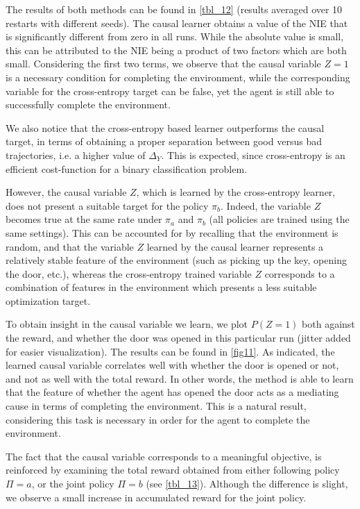 \documentclass[letterpaper]{article} %
\newcommand{\EE}{\mathbb{E}}
\newcommand{\NIE}{\textrm{NIE}\xspace}
\begin{document}
	The results of both methods can be found in \cref{tbl_12} (results averaged over 10 restarts with different seeds). The causal learner obtains a value of the \NIE that is significantly different from zero in all runs. While the absolute value is small, this can be attributed to the \NIE being a product of two factors which are both small. Considering the first two terms, we observe that the causal variable $Z=1$ is a necessary condition for completing the environment, while the corresponding variable for the cross-entropy target can be false, yet the agent is still able to successfully complete the environment.

	We also notice that the cross-entropy based learner outperforms the causal target, in terms of obtaining a proper separation between good versus bad trajectories, i.e. a higher value of $\Delta_Y$. %
	This is expected, since cross-entropy is an efficient cost-function for a binary classification problem.

	However, the causal variable $Z$, which is learned by the cross-entropy learner, does not present a suitable target for the policy $\pi_b$. Indeed, the variable $Z$ becomes true at the same rate under $\pi_a$ and $\pi_b$ (all policies are trained using the same settings). This can be accounted for by recalling that the environment is random, and that the variable $Z$ learned by the causal learner represents a relatively stable feature of the environment (such as picking up the key, opening the door, etc.), whereas the cross-entropy trained variable $Z$ corresponds to a combination of features in the environment which presents a less suitable optimization target.



	To obtain insight in the causal variable we learn, we plot $P(Z=1)$ both against the reward, and whether the door was opened in this particular run (jitter added for easier visualization). The results can be found in \cref{fig11}. As indicated, the learned causal variable correlates well with whether the door is opened or not, and not as well with the total reward. In other words, the method is able to learn that the feature of whether the agent has opened the door acts as a mediating cause in terms of completing the environment. This is a natural result, considering this task is necessary in order for the agent to complete the environment.



	The fact that the causal variable corresponds to a meaningful objective, is reinforced by examining the total reward obtained from either following policy $\Pi =a$, or the joint policy $\Pi=b$ (see \cref{tbl_13}). Although the difference is slight, we observe a small increase in accumulated reward for the joint policy.
\end{document}
